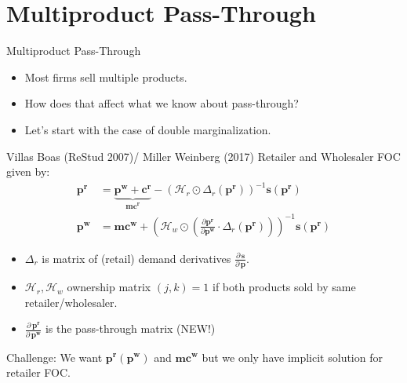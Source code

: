\section{Multiproduct Pass-Through}


\begin{frame}{Multiproduct Pass-Through}

\begin{itemize}
\item Most firms sell multiple products.
\item How does that affect what we know about pass-through?
\item Let's start with the case of \alert{double marginalization}.
\end{itemize}
\end{frame}

\begin{frame}{Villas Boas (ReStud 2007)/ Miller Weinberg (2017)}
Retailer and Wholesaler FOC given by:
\begin{align*}
\mathbf{p^r} &= \underbrace{\mathbf{p^w} +\mathbf{c^r}}_{\mathbf{mc^r}} -(\mathcal{H}_r \odot \Delta_{r}(\mathbf{p^r}))^{-1} \mathbf{s}(\mathbf{p^r})\\
\mathbf{p^w}  &= \mathbf{mc^w} + \left(\mathcal{H}_{w} \odot \left( \frac{\partial \mathbf{p^r}}{\partial \mathbf{p^w}} \cdot  \Delta_r(\mathbf{p^r} ) \right) \right)^{-1} \mathbf{s}(\mathbf{p^r})
\end{align*}
\begin{itemize}
  \item $\Delta_r$ is matrix of (retail) demand derivatives $\frac{\partial\, \mathbf{s}}{\partial\, \mathbf{p}}$.
\item $\mathcal{H}_r,\mathcal{H}_w$  ownership matrix $(j,k)=1$ if both products sold by same retailer/wholesaler.
\item $\frac{\partial\, \mathbf{p^r}}{\partial\, \mathbf{p^w}}$ is the \alert{pass-through matrix} (NEW!)
\end{itemize}
Challenge: We want $\mathbf{p^r}(\mathbf{p^w})$ and $\mathbf{mc^w}$ but we only have implicit solution for retailer FOC.
\end{frame}

